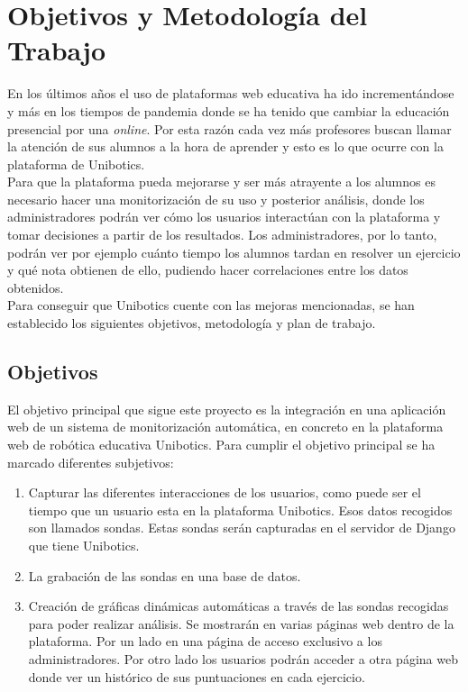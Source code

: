\chapter{Objetivos y Metodología del Trabajo}\label{objetivos}

En los últimos años el uso de plataformas web educativa ha ido incrementándose y más en los tiempos de pandemia donde se ha tenido que cambiar la educación presencial por una \textit{online}. Por esta razón cada vez más profesores buscan llamar la atención de sus alumnos a la hora de aprender y esto es lo que ocurre con la plataforma de Unibotics.\\

Para que la plataforma pueda mejorarse y ser más atrayente a los alumnos es necesario hacer una monitorización de su uso y posterior análisis, donde los administradores podrán ver cómo los usuarios interactúan con la plataforma y tomar decisiones a partir de los resultados. Los administradores, por lo tanto, podrán ver por ejemplo cuánto tiempo los alumnos tardan en resolver un ejercicio y qué nota obtienen de ello, pudiendo hacer correlaciones entre los datos obtenidos.\\

Para conseguir que Unibotics cuente con las mejoras mencionadas, se han establecido los siguientes objetivos, metodología y plan de trabajo.


\section{Objetivos}

El objetivo principal que sigue este proyecto es la integración en una aplicación web de un sistema de monitorización automática,
en concreto en la plataforma web de robótica educativa
Unibotics. Para cumplir el objetivo principal se ha marcado diferentes subjetivos:\\

\begin{enumerate}
\item Capturar las diferentes interacciones de los usuarios, como puede ser el tiempo que un usuario esta en la plataforma Unibotics. Esos datos recogidos son llamados sondas. Estas sondas serán capturadas en el servidor de Django que tiene Unibotics.
\item La grabación de las sondas en una base de datos.
\item Creación de gráficas dinámicas automáticas a través de las sondas recogidas para poder realizar análisis. Se mostrarán en varias páginas web dentro de la plataforma. Por un lado en una página de acceso exclusivo a los administradores. Por otro lado los usuarios podrán acceder a otra página web donde ver un histórico de sus puntuaciones en cada ejercicio.
\end{enumerate}

